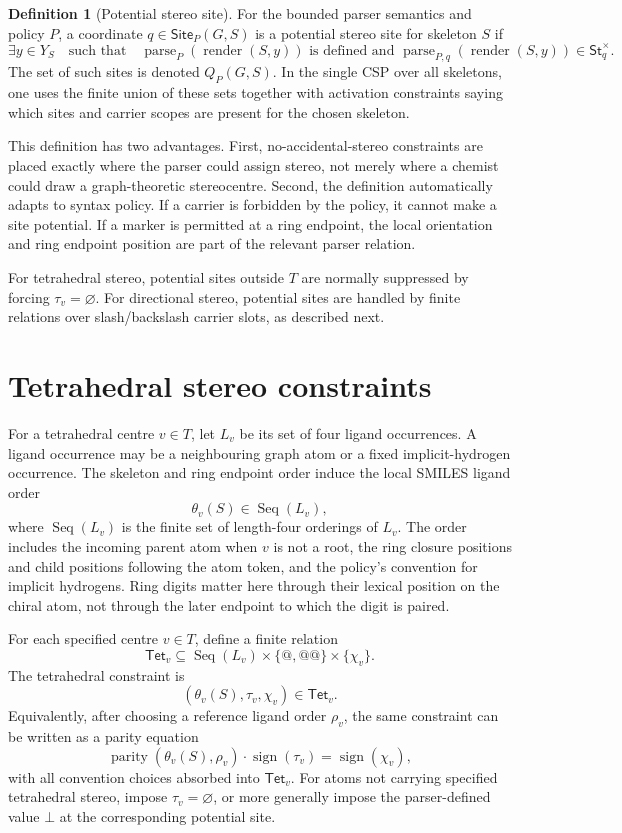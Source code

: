 \documentclass[10pt,a4paper]{article}
\newcommand{\render}{\operatorname{render}}
\newcommand{\parse}{\operatorname{parse}}
\newcommand{\None}{\bot}
\newcommand{\Tet}{\mathsf{Tet}}
\newcommand{\St}{\mathsf{St}}
\newcommand{\Site}{\mathsf{Site}}
\theoremstyle{definition}
\newtheorem{definition}[lemma]{Definition}
\theoremstyle{remark}
\begin{document}
	\begin{definition}[Potential stereo site]
		For the bounded parser semantics and policy \(P\), a coordinate
		\(q\in\Site_P(G,S)\) is a potential stereo site for skeleton \(S\) if
		\[
		\exists y\in Y_S
		\quad \text{such that}\quad
		\parse_P(\render(S,y))\text{ is defined and }
		\parse_{P,q}(\render(S,y))\in\St_q^\times .
		\]
		The set of such sites is denoted \(Q_P(G,S)\).  In the single CSP over all
		skeletons, one uses the finite union of these sets together with activation
		constraints saying which sites and carrier scopes are present for the chosen
		skeleton.
	\end{definition}

	This definition has two advantages.  First, no-accidental-stereo constraints are
	placed exactly where the parser could assign stereo, not merely where a chemist
	could draw a graph-theoretic stereocentre.  Second, the definition automatically
	adapts to syntax policy.  If a carrier is forbidden by the policy, it cannot
	make a site potential.  If a marker is permitted at a ring endpoint, the local
	orientation and ring endpoint position are part of the relevant parser relation.

	For tetrahedral stereo, potential sites outside \(T\) are normally suppressed by
	forcing \(\tau_v=\varnothing\).  For directional stereo, potential sites are
	handled by finite relations over slash/backslash carrier slots, as described
	next.

	\section{Tetrahedral stereo constraints}
	\label{s:tetrahedral}

	For a tetrahedral centre \(v\in T\), let \(L_v\) be its set of four ligand
	occurrences.  A ligand occurrence may be a neighbouring graph atom or a fixed
	implicit-hydrogen occurrence.  The skeleton and ring endpoint order induce the
	local SMILES ligand order
	\[
	\theta_v(S)\in\operatorname{Seq}(L_v),
	\]
	where \(\operatorname{Seq}(L_v)\) is the finite set of length-four orderings of
	\(L_v\).  The order includes the incoming parent atom when \(v\) is not a root,
	the ring closure positions and child positions following the atom token, and the
	policy's convention for implicit hydrogens.  Ring digits matter here through
	their lexical position on the chiral atom, not through the later endpoint to
	which the digit is paired.

	For each specified centre \(v\in T\), define a finite relation
	\[
	\Tet_v
	\subseteq
	\operatorname{Seq}(L_v)\times \{@,@@\}\times\{\chi_v\} .
	\]
	The tetrahedral constraint is
	\[
	(\theta_v(S),\tau_v,\chi_v)\in\Tet_v .
	\]
	Equivalently, after choosing a reference ligand order \(\rho_v\), the same
	constraint can be written as a parity equation
	\[
	\operatorname{parity}(\theta_v(S),\rho_v)
	\cdot \operatorname{sign}(\tau_v)
	=\operatorname{sign}(\chi_v),
	\]
	with all convention choices absorbed into \(\Tet_v\).  For atoms not carrying
	specified tetrahedral stereo, impose \(\tau_v=\varnothing\), or more generally
	impose the parser-defined value \(\None\) at the corresponding potential site.
\end{document}
